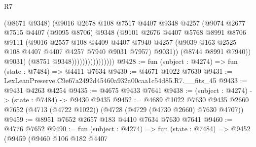 \begin{lexlean}{R7}
\begin{coremodule}
                                  (@8671 @9348)
                                  (@9016
                                    @2678
                                    @108
                                    @7517
                                    @4407
                                    @9348
                                    @4257
                                    (@9074
                                      @2677
                                      @7515
                                      @4407
                                      (@9095 @8706)
                                      @9348
                                      (@9101
                                        @2676
                                        @4407
                                        @5768
                                        @8991
                                        @8706
                                        @9111
                                        (@9016
                                          @2557
                                          @108
                                          @4409
                                          @4407
                                          @7940
                                          @4257
                                          (@9039
                                            @163
                                            @2525
                                            @108
                                            @4407
                                            @4407
                                            @4257
                                            @7940
                                            @9031
                                            @7957)
                                          @9031))
                                      (@8744 @8991 @7940))
                                    @9031)
                                  (@8751 @9348))))))))))))))))
@9428 := fun (subject : @4274) => fun (state : @7484) => @4411 @7634
@9430 := @4671 @1022 @7630
@9431 := LexLeanPreserve.C9e67a2492d45460a932a00caa1c54d85.R7.__fits_45
@9433 := @9431 @4263 @4254
@9435 := @4675 @9433 @7641
@9438 := (subject : @4274) -> (state : @7484) -> @9430 @9435
@9452 := @4689
    @1022
    @7630
    @9435
    @2660
    @7652
    (@4713 (@4722 @1022))
    (@4728 (@4729 (@4730 @2660) @7630 @4707))
@9459 := @8951 @7652 @2657 @183 @4410 @7634 @7630 @7641
@9460 := @4776 @7652
@9490 := fun (subject : @4274) =>
  fun (state : @7484) =>
  @9452
    (@9459
      (@9460
        @106
        @182
        @4407

\end{coremodule}
\end{lexlean}
